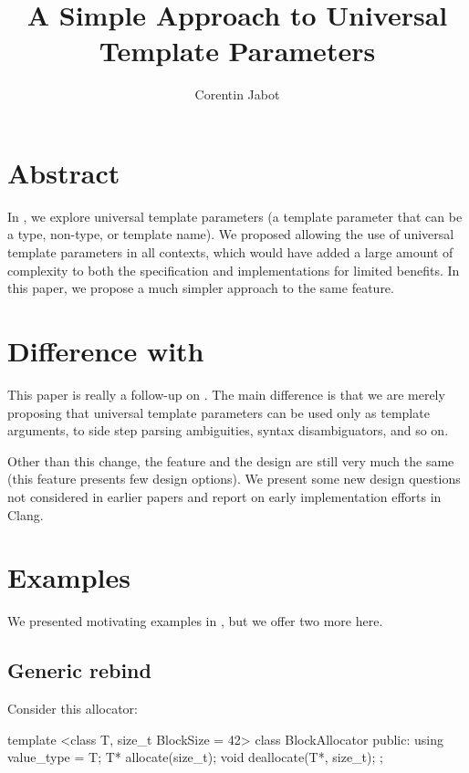 \documentclass{wg21}
\title{A Simple Approach to Universal Template Parameters}
\author{Corentin Jabot}{corentin.jabot@gmail.com}
\begin{document}
\maketitle

\section{Abstract}
In , we explore universal template parameters (a template parameter that can be a type, non-type, or template name).
We proposed allowing the use of universal template parameters in all contexts, which would have added a large amount of complexity to both the specification and implementations
for limited benefits. In this paper, we propose a much simpler approach to the same feature.

\section{Difference with }

This paper is really a follow-up on .
The main difference is that we are merely proposing that universal template parameters can be used only as template arguments, to side step parsing ambiguities, syntax disambiguators, and so on.

Other than this change, the feature and the design are still very much the same (this feature presents few design options).
We present some new design questions not considered in earlier papers and report on early implementation efforts in Clang.


\section{Examples}

We presented motivating examples in , but we offer two more here.

\subsection{Generic rebind}

Consider this allocator:

\begin{colorblock}
template <class T, size_t BlockSize = 42>
class BlockAllocator {
    public:
    using value_type = T;
    T* allocate(size_t);
    void deallocate(T*, size_t);
};
\end{colorblock}
\end{document}
